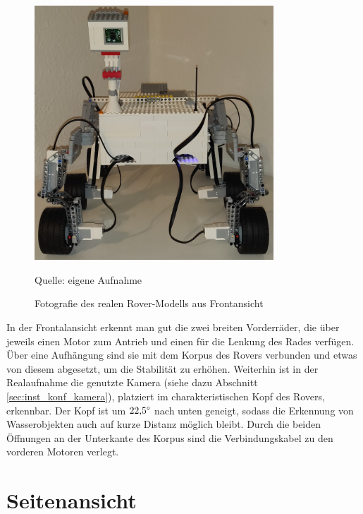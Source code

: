 \begin{figure}
	\centering
	\includegraphics[width=0.8\textwidth]{../Images/20200429_front_01.jpg}
	\vspace{0.5em}
	\parbox[c]{0.8\linewidth}{\footnotesize
		\centering
		\vspace{1em}
		Quelle: eigene Aufnahme
	}
	\caption{Fotografie des realen Rover-Modells aus Frontansicht}
	\label{fig:roverfrontfoto}
\end{figure}

In der Frontalansicht erkennt man gut die zwei breiten Vorderräder, die über jeweils einen Motor zum Antrieb und einen für die Lenkung des Rades verfügen.
Über eine Aufhängung sind sie mit dem Korpus des Rovers verbunden und etwas von diesem abgesetzt, um die Stabilität zu erhöhen.
Weiterhin ist in der Realaufnahme die genutzte Kamera (siehe dazu Abschnitt \ref{sec:inst_konf_kamera}), platziert im charakteristischen Kopf des Rovers, erkennbar.
Der Kopf ist um $22{,}5 \degree$ nach unten geneigt, sodass die Erkennung von Wasserobjekten auch auf kurze Distanz möglich bleibt.
Durch die beiden Öffnungen an der Unterkante des Korpus sind die Verbindungskabel zu den vorderen Motoren verlegt.

\section{Seitenansicht}
\label{sec:seitenansicht}

